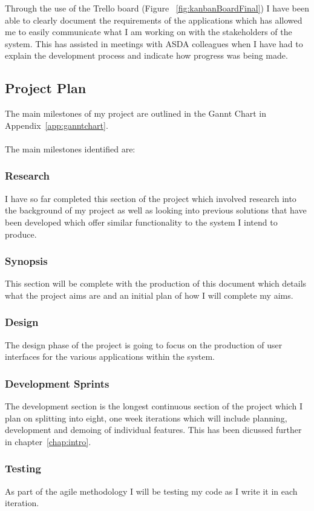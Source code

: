 \documentclass[a4paper,11pt]{report}
\begin{document}
Through the use of the Trello board (Figure ~\ref{fig:kanbanBoardFinal}) I have been able to clearly document the requirements of the applications which has allowed me to easily communicate what I am working on with the stakeholders of the system. This has assisted in meetings with ASDA colleagues when I have had to explain the development process and indicate how progress was being made.

\subsection{Project Plan}
The main milestones of my project are outlined in the Gannt Chart in Appendix~\ref{app:ganntchart}. 
\\
\\
The main milestones identified are: 
\subsubsection{Research}
I have so far completed this section of the project which involved research into the background of my project as well as looking into previous solutions that have been developed which offer similar functionality to the system I intend to produce.
\subsubsection{Synopsis}
This section will be complete with the production of this document which details what the project aims are and an initial plan of how I will complete my aims.
\subsubsection{Design}
The design phase of the project is going to focus on the production of user interfaces for the various applications within the system.
\subsubsection{Development Sprints}
The development section is the longest continuous section of the project which I plan on splitting into eight, one week iterations which will include planning, development and demoing of individual features. This has been dicussed further in chapter~\ref{chap:intro}.
\subsubsection{Testing}
As part of the agile methodology I will be testing my code as I write it in each iteration.
\end{document}
